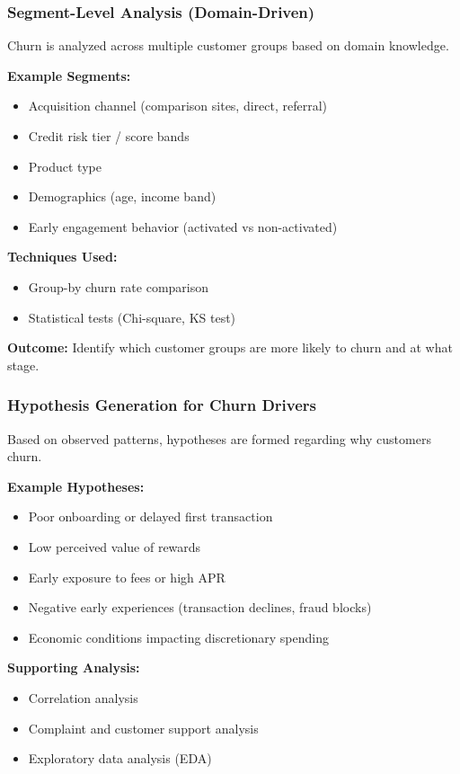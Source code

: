 \documentclass[10pt,a4paper]{article}
\begin{document}
	\subsubsection{Segment-Level Analysis (Domain-Driven)}
	
	Churn is analyzed across multiple customer groups based on domain knowledge.
	
	\textbf{Example Segments:}
	\begin{itemize}
	    \item Acquisition channel (comparison sites, direct, referral)
	    \item Credit risk tier / score bands
	    \item Product type
	    \item Demographics (age, income band)
	    \item Early engagement behavior (activated vs non-activated)
	\end{itemize}
	
	\textbf{Techniques Used:}
	\begin{itemize}
	    \item Group-by churn rate comparison
	    \item Statistical tests (Chi-square, KS test)
	\end{itemize}
	
	\textbf{Outcome:} Identify which customer groups are more likely to churn and at what stage.
	
	\subsubsection{Hypothesis Generation for Churn Drivers}
	
	Based on observed patterns, hypotheses are formed regarding why customers churn.
	
	\textbf{Example Hypotheses:}
	\begin{itemize}
	    \item Poor onboarding or delayed first transaction
	    \item Low perceived value of rewards
	    \item Early exposure to fees or high APR
	    \item Negative early experiences (transaction declines, fraud blocks)
	    \item Economic conditions impacting discretionary spending
	\end{itemize}
	
	\textbf{Supporting Analysis:}
	\begin{itemize}
	    \item Correlation analysis
	    \item Complaint and customer support analysis
	    \item Exploratory data analysis (EDA)
	\end{itemize}
	
\end{document}
